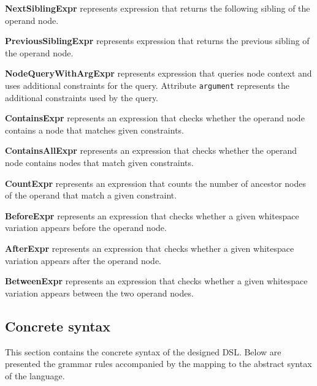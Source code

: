 \documentclass[parskip=full]{uvamscse}
\begin{document}
\begin{description}

\item\textbf{NextSiblingExpr} represents expression that returns the following sibling of the operand node.

\item\textbf{PreviousSiblingExpr} represents expression that returns the previous sibling of the operand node.

\item\textbf{NodeQueryWithArgExpr} represents expression that queries node context and uses additional constraints for the query. Attribute \texttt{argument} represents the additional constraints used by the query.

\item\textbf{ContainsExpr} represents an expression that checks whether the operand node contains a node that matches given constraints.

\item\textbf{ContainsAllExpr} represents an expression that checks whether the operand node contains nodes that match given constraints.

\item\textbf{CountExpr} represents an expression that counts the number of ancestor nodes of the operand that match a given constraint.

\item\textbf{BeforeExpr} represents an expression that checks whether a given whitespace variation appears before the operand node.

\item\textbf{AfterExpr} represents an expression that checks whether a given whitespace variation appears after the operand node.

\item\textbf{BetweenExpr} represents an expression that checks whether a given whitespace variation appears between the two operand nodes.

\end{description}

\subsection{Concrete syntax}

This section contains the concrete syntax of the designed DSL. Below are presented the grammar rules accompanied by the mapping to the abstract syntax of the language.
\end{document}
